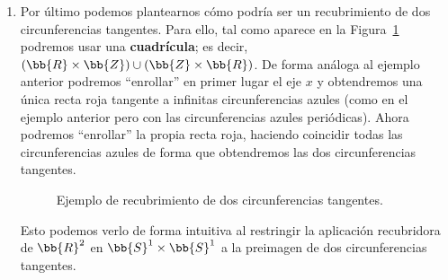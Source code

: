 \begin{ejemplo}
\begin{enumerate}
        \item Por último podemos plantearnos cómo podría ser un recubrimiento de dos circunferencias tangentes. Para ello, tal como aparece en la Figura~\ref{fig:recubrimiento_dos_circunferencias_tangentes} podremos usar una \textbf{cuadrícula}; es decir, $(\bb{R}\times \bb{Z})\cup (\bb{Z}\times \bb{R})$. De forma análoga al ejemplo anterior podremos ``enrollar'' en primer lugar el eje $x$ y obtendremos una única recta roja tangente a infinitas circunferencias azules (como en el ejemplo anterior pero con las circunferencias azules periódicas). Ahora podremos ``enrollar'' la propia recta roja, haciendo coincidir todas las circunferencias azules de forma que obtendremos las dos circunferencias tangentes.
        
        \begin{figure}[ht]
            \centering
            \caption{Ejemplo de recubrimiento de dos circunferencias tangentes.}
            \label{fig:recubrimiento_dos_circunferencias_tangentes}
        \end{figure}

        Esto podemos verlo de forma intuitiva al restringir la aplicación recubridora de $\bb{R}^2$ en $\bb{S}^1\times \bb{S}^1$ a la preimagen de dos circunferencias tangentes.
    \end{enumerate}
\end{ejemplo}


